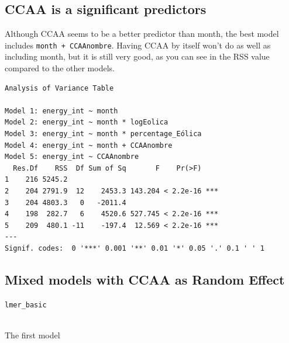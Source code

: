 \documentclass[
]{report}
\begin{document}
\hypertarget{ccaa-is-a-significant-predictors}{%
\subsection{CCAA is a significant
predictors}\label{ccaa-is-a-significant-predictors}}

Although CCAA seems to be a better predictor than month, the best model
includes \texttt{month\ +\ CCAAnombre}. Having CCAA by itself won't do
as well as including month, but it is still very good, as you can see in
the RSS value compared to the other models.

\begin{verbatim}
Analysis of Variance Table

Model 1: energy_int ~ month
Model 2: energy_int ~ month * logEolica
Model 3: energy_int ~ month * percentage_Eólica
Model 4: energy_int ~ month + CCAAnombre
Model 5: energy_int ~ CCAAnombre
  Res.Df    RSS  Df Sum of Sq       F    Pr(>F)    
1    216 5245.2                                    
2    204 2791.9  12    2453.3 143.204 < 2.2e-16 ***
3    204 4803.3   0   -2011.4                      
4    198  282.7   6    4520.6 527.745 < 2.2e-16 ***
5    209  480.1 -11    -197.4  12.569 < 2.2e-16 ***
---
Signif. codes:  0 '***' 0.001 '**' 0.01 '*' 0.05 '.' 0.1 ' ' 1
\end{verbatim}

\hypertarget{mixed-models-with-ccaa-as-random-effect}{%
\subsection{Mixed models with CCAA as Random
Effect}\label{mixed-models-with-ccaa-as-random-effect}}

\texttt{lmer\_basic}\strut \\
The first model
\end{document}
